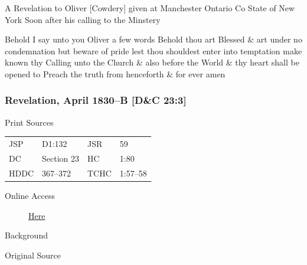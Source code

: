 				A Revelation to Oliver [Cowdery] given at Manchester Ontario Co State of New York Soon after his calling to the Minstery

				Behold I say unto you Oliver a few words Behold thou art Blessed \& art under no condemnation but beware of pride lest thou shouldest enter into temptation make known thy Calling unto the Church \& also before the World \& thy heart shall be opened to Preach the truth from henceforth \& for ever amen
				
		\subsubsection{Revelation, April 1830--B [D\&C 23:3]}
			\label{EMS-1830-JS-APR-1830-B}
		
			\begin{description}
				\item[Print Sources]
			\end{description}

				\begin{tabular}{p{0.5in}p{1in}p{0.5in}p{1in}}
				JSP	 	& D1:132		& JSR 		& 59	 \\
				DC	 	& Section 23	& HC 		& 1:80	 \\
				HDDC 	& 367--372		& TCHC 		& 1:57--58 \\
				\end{tabular}
			
			\begin{description}
				\item[Online Access] \href{https://www.josephsmithpapers.org/paper-summary/revelation-april-1830-b-dc-233/1}{Here}
			\end{description}
			
			\begin{description}
				\item[Background]
			\end{description}
			
			
			\begin{description}
				\item[Original Source]
			\end{description}
			
